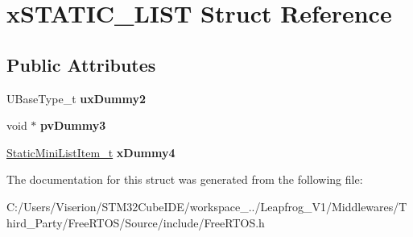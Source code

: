 \hypertarget{structx_s_t_a_t_i_c___l_i_s_t}{}\section{x\+S\+T\+A\+T\+I\+C\+\_\+\+L\+I\+ST Struct Reference}
\label{structx_s_t_a_t_i_c___l_i_s_t}
\subsection*{Public Attributes}
\begin{DoxyCompactItemize}
\item 
\mbox{\label{structx_s_t_a_t_i_c___l_i_s_t_aa0522bc6ec8c956a9177ed9cb0e6d19f}} 
U\+Base\+Type\+\_\+t {\bfseries ux\+Dummy2}
\item 
\mbox{\label{structx_s_t_a_t_i_c___l_i_s_t_aee46aef7379c7a341ec5a3e70d6dc85f}} 
void $\ast$ {\bfseries pv\+Dummy3}
\item 
\mbox{\label{structx_s_t_a_t_i_c___l_i_s_t_aafa5f9d67d7f3636f2d1f8c372e75ecf}} 
\mbox{\hyperlink{structx_s_t_a_t_i_c___m_i_n_i___l_i_s_t___i_t_e_m}{Static\+Mini\+List\+Item\+\_\+t}} {\bfseries x\+Dummy4}
\end{DoxyCompactItemize}


The documentation for this struct was generated from the following file\+:\begin{DoxyCompactItemize}
\item 
C\+:/\+Users/\+Viserion/\+S\+T\+M32\+Cube\+I\+D\+E/workspace\+\_../\+Leapfrog\+\_\+\+V1/\+Middlewares/\+Third\+\_\+\+Party/\+Free\+R\+T\+O\+S/\+Source/include/Free\+R\+T\+O\+S.\+h\end{DoxyCompactItemize}
